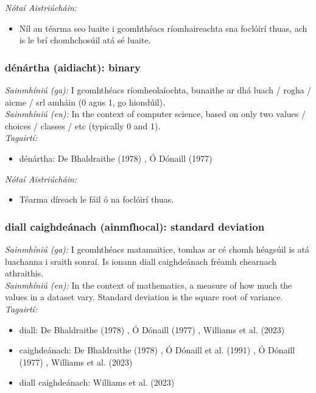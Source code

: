 \documentclass{article}
\begin{document}
 \noindent \textit{Nótaí Aistriúcháin:}
\begin{itemize}
	\item Níl an téarma seo luaite i gcomhthéacs ríomhaireachta sna foclóirí thuas, ach is le brí chomhchosúil atá sé luaite.
\end{itemize}


\subsubsection*{dénártha (aidiacht): binary}
 \noindent \textit{Sainmhíniú (ga):} I gcomhthéacs ríomheolaíochta, bunaithe ar dhá luach / rogha / aicme / srl amháin (0 agus 1, go hiondúil).
\\
 \noindent \textit{Sainmhíniú (en):} In the context of computer science, based on only two values / choices / classes / etc (typically 0 and 1).
\\
 \noindent \textit{Tagairtí:}
\begin{itemize}
	\item dénártha: De Bhaldraithe (1978) \cite{de-bhaldraithe}, Ó Dónaill (1977) \cite{odonaill}
\end{itemize}

 \noindent \textit{Nótaí Aistriúcháin:}
\begin{itemize}
	\item Téarma díreach le fáil ó na foclóirí thuas.
\end{itemize}


\subsubsection*{diall caighdeánach (ainmfhocal): standard deviation}
 \noindent \textit{Sainmhíniú (ga):} I gcomhthéacs matamaitice, tomhas ar cé chomh héagsúil is atá luachanna i sraith sonraí. Is ionann diall caighdeánach fréamh chearnach athraithis.
\\
 \noindent \textit{Sainmhíniú (en):} In the context of mathematics, a measure of how much the values in a dataset vary. Standard deviation is the square root of variance.
\\
 \noindent \textit{Tagairtí:}
\begin{itemize}
	\item diall: De Bhaldraithe (1978) \cite{de-bhaldraithe}, Ó Dónaill (1977) \cite{odonaill}, Williams et al. (2023) \cite{storchiste}
	\item caighdeánach: De Bhaldraithe (1978) \cite{de-bhaldraithe}, Ó Dónaill et al. (1991) \cite{focloir-beag}, Ó Dónaill (1977) \cite{odonaill}, Williams et al. (2023) \cite{storchiste}
	\item diall caighdeánach: Williams et al. (2023) \cite{storchiste}
\end{itemize}
\end{document}

